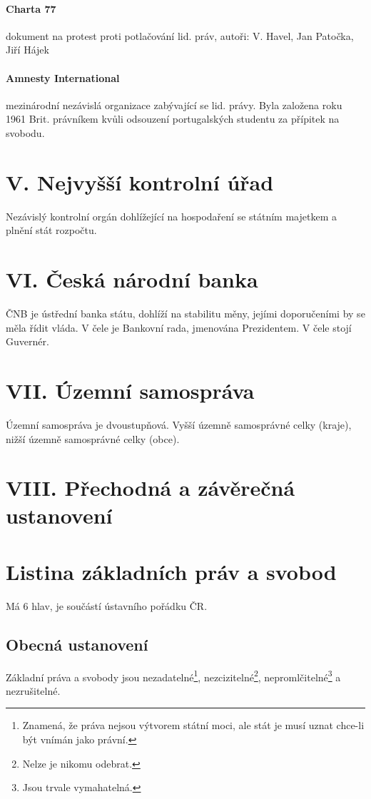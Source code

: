 \documentclass[10pt,a4paper,
twoside,%
]{report}
\begin{document}
\paragraph{Charta 77} dokument na protest proti potlačování lid. práv, autoři: V. Havel, Jan Patočka, Jiří Hájek

\paragraph{Amnesty International} mezinárodní nezávislá organizace zabývající se lid. právy. Byla založena roku 1961 Brit. právníkem kvůli odsouzení portugalských studentu za přípitek na svobodu.

\section[V. hlava]{V. Nejvyšší kontrolní úřad}
Nezávislý kontrolní orgán dohlížející na hospodaření se státním majetkem a plnění stát rozpočtu. 

\section[VI. hlava]{VI. Česká národní banka}
ČNB je ústřední banka státu, dohlíží na stabilitu měny, jejími doporučeními by se měla řídit vláda. V čele  je Bankovní rada, jmenována Prezidentem. V čele stojí Guvernér.

\section{VII. Územní samospráva}
Územní samospráva je dvoustupňová. Vyšší územně samosprávné celky (kraje), nižší územně samosprávné celky (obce).

\section{VIII. Přechodná a závěrečná ustanovení}

\section{Listina základních práv a svobod}
Má 6 hlav, je součástí ústavního pořádku ČR.
\subsection{Obecná ustanovení}
 Základní práva a svobody jsou nezadatelné\footnote{Znamená, že práva nejsou výtvorem státní moci, ale stát je musí uznat chce-li být vnímán jako právní.}, nezcizitelné\footnote{Nelze je nikomu odebrat.}, nepromlčitelné\footnote{Jsou trvale vymahatelná.} a nezrušitelné.
 
\end{document}
